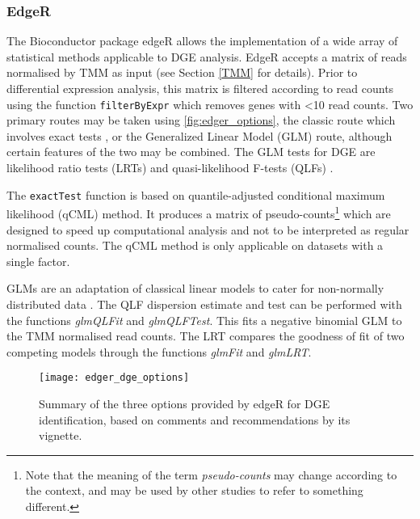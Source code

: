 \subsubsection{EdgeR}
\label{EdgeR}

The Bioconductor package edgeR allows the implementation of a wide array of statistical methods applicable to \ac{DGE} analysis. EdgeR accepts a matrix of reads normalised by \ac{TMM} as input (see Section \ref{TMM} for details). Prior to differential expression analysis, this matrix is filtered according to read counts using the function \texttt{filterByExpr} which removes genes with <10 read counts. Two primary routes may be taken using \autoref{fig:edger_options}, the classic route which involves exact tests \citep{robinson2007moderated, robinson2008small}, or the Generalized Linear Model (GLM) route, although certain features of the two may be combined. The GLM tests for \ac{DGE} are likelihood ratio tests (LRTs) \citep{mccarthy2012differential} and quasi-likelihood F-tests (QLFs) \citep{lun2016s, lund2012detecting}.

The \texttt{exactTest} function is based on quantile-adjusted conditional maximum likelihood (qCML) method. It produces a matrix of pseudo-counts\footnote{Note that the meaning of the term \textit{pseudo-counts} may change according to the context, and may be used by other studies to refer to something different.} which are designed to speed up computational analysis and not to be interpreted as regular normalised counts. The qCML method is only applicable on datasets with a single factor.

GLMs are an adaptation of classical linear models to cater for non-normally distributed data \citep{dunn2018generalized}. The QLF dispersion estimate and test can be performed with the functions \textit{glmQLFit} and \textit{glmQLFTest}. This fits a negative binomial GLM to the \ac{TMM} normalised read counts. The LRT compares the goodness of fit of two competing models through the functions \textit{glmFit} and \textit{glmLRT}.

\begin{figure}[h!]
    \centering
    \texttt{[image: edger\_dge\_options]}
    \caption[Summary of the options provided by edgeR for DGE identification]{Summary of the three options provided by edgeR for \ac{DGE} identification, based on comments and recommendations by its vignette. } 
    \label{fig:edger_options}
\end{figure}

